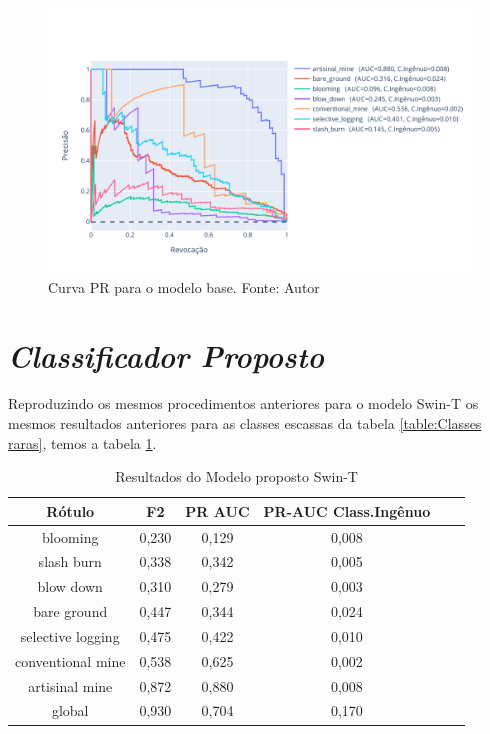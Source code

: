 \begin{figure}[!ht]
    \centering
    \includegraphics[width=\columnwidth]{Imagens/results/rsp-resnet-50_planet_pt/Curva PR para classes raras.pdf}
    \caption{ Curva PR para o modelo base. Fonte: Autor}
   \label{fig:CurvaPRResnet50}
\end{figure}   

   


\section{\textit{Classificador Proposto}}\label{sec:Cap4_ClassifiadorProposto}

Reproduzindo os mesmos procedimentos anteriores para o modelo Swin-T os mesmos resultados anteriores para as classes escassas da tabela \ref{table:Classes raras}, temos a tabela \ref{table:ResultadosSwinT}. 



\begin{table}[h!]
        \caption{Resultados do Modelo proposto Swin-T}
        \centering
    \begin{tabular}{*{6}{c}}
        \toprule
                     Rótulo &  F2    &   PR AUC &  PR-AUC Class.Ingênuo \\
        \midrule
                  blooming &  0,230 &    0,129 &       0,008 \\
                slash burn &  0,338 &    0,342 &       0,005 \\
                 blow down &  0,310 &    0,279 &       0,003 \\
               bare ground &  0,447 &    0,344 &       0,024 \\
         selective logging &  0,475 &    0,422 &       0,010 \\
         conventional mine &  0,538 &    0,625 &       0,002 \\
            artisinal mine &  0,872 &    0,880 &       0,008 \\
                    global &  0,930 &    0,704 &       0,170 \\
        \bottomrule
    \end{tabular}
    \label{table:ResultadosSwinT}
\end{table}

